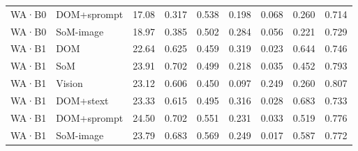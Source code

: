\begin{table}[tp]
\begin{tabular}{@{}lllllllll@{}}
WA·B0 & DOM+sprompt & 17.08 & 0.317 & 0.538 & 0.198 & 0.068 & 0.260 & 0.714 \\
WA·B0 & SoM-image & 18.97 & 0.385 & 0.502 & 0.284 & 0.056 & 0.221 & 0.729 \\
WA·B1 & DOM & 22.64 & 0.625 & 0.459 & 0.319 & 0.023 & 0.644 & 0.746 \\
WA·B1 & SoM & 23.91 & 0.702 & 0.499 & 0.218 & 0.035 & 0.452 & 0.793 \\
WA·B1 & Vision & 23.12 & 0.606 & 0.450 & 0.097 & 0.249 & 0.260 & 0.807 \\
WA·B1 & DOM+stext & 23.33 & 0.615 & 0.495 & 0.316 & 0.028 & 0.683 & 0.733 \\
WA·B1 & DOM+sprompt & 24.50 & 0.702 & 0.551 & 0.231 & 0.033 & 0.519 & 0.776 \\
WA·B1 & SoM-image & 23.79 & 0.683 & 0.569 & 0.249 & 0.017 & 0.587 & 0.772 \\
\bottomrule
\end{tabular}
\end{table}
